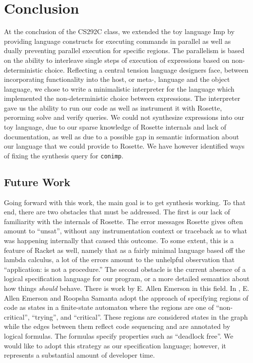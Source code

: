 \section{Conclusion}
At the conclusion of the CS292C class, we extended the toy language Imp by providing language constructs for executing commands in parallel as well as dually preventing parallel execution for specific regions.  The parallelism is based on the ability to interleave single steps of execution of expressions based on non-deterministic choice.  Reflecting a central tension language designers face, between incorporating functionality into the host, or meta-, language and the object language, we chose to write a minimalistic interpreter for the language which implemented the non-deterministic choice between expressions.  The interpreter gave us the ability to run our code as well as instrument it with Rosette, perorming solve and verify queries.  We could not synthesize expressions into our toy language, due to our sparse knowledge of Rosette internals and lack of documentation, as well as due to a possible gap in semantic information about our language that we could provide to Rosette.  We have however identified ways of fixing the synthesis query for \texttt{conimp}.

\subsection{Future Work}
Going forward with this work, the main goal is to get synthesis working.  To that end, there are two obstacles that must be addressed.  The first is our lack of familiarity with the internals of Rosette.  The error messages Rosette gives often amount to ``unsat'', without any instrumentation context or traceback as to what was happening internally that caused this outcome.  To some extent, this is a feature of Racket as well, namely that as a fairly minimal language based off the lambda calculus, a lot of the errors amount to the unhelpful observation that ``application: is not a procedure.''  The second obstacle is the current absence of a logical specification language for our program, or a more detailed semantics about how things {\em should} behave.  There is work by E. Allen Emerson in this field.  In \cite{emerson2011}, E. Allen Emerson and Roopsha Samanta adopt the approach of specifying regions of code as states in a finite-state automaton where the regions are one of ``non-critical'', ``trying'', and ``critical''.  These regions are considered states in the graph while the edges between them reflect code sequencing and are annotated by logical formulas.  The formulas specify properties such as ``deadlock free''.  We would like to adopt this strategy as our specification language; however, it represents a substantial amount of developer time.

